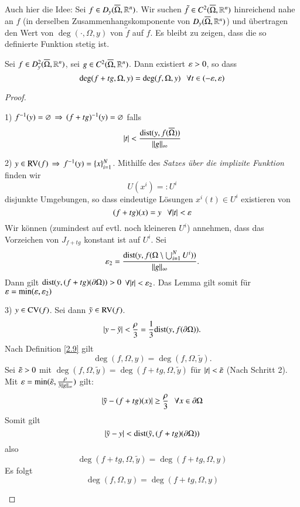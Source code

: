 Auch hier die Idee: Sei $f\in D_y(\overline \Omega, \mathbb{R}^n)$. Wir suchen $\tilde f \in C^2 (\overline \Omega, \mathbb{R}^n)$
hinreichend nahe an $f$ (in derselben Zusammenhangskomponente von $D_y(\overline \Omega, \mathbb{R}^n)$) und übertragen
den Wert von $\deg(\cdot , \Omega, y)$ von $\tilde f$ auf $f$. Es bleibt zu zeigen, dass die so
definierte Funktion stetig ist.

\begin{lem}\label{2.10}
    Sei $f\in D_y^2(\overline \Omega, \mathbb{R}^n)$, sei $g\in C^2(\overline \Omega, \mathbb{R}^n)$. Dann existiert $\varepsilon >0$, so 
    dass
    \[
        \deg (f+tg,\Omega,y)= \deg(f,\Omega,y) \hspace{.25cm} \forall t\in (-\varepsilon,\varepsilon)
    \]
\end{lem}
\begin{proof}
    \begin{description}
        \item{1)}
        $f^{-1}(y)=\varnothing \, \Rightarrow \, (f+tg)^{-1}(y)=\varnothing$ falls
        \[
            |t| < \frac{\mathrm{dist}(y,f(\overline \Omega))}{\|g\|_\infty}
        \]
        \item{2)}
        $y\in \mathrm{RV} (f) \, \Rightarrow \, f^{-1}(y)=\{x\}_{i=1}^N$. Mithilfe des \textit{Satzes über die 
            implizite Funktion} finden wir
            \[
                U(x^i)=:U^i
            \]
            disjunkte Umgebungen, so dass eindeutige Lösungen $x^i(t)\in U^i$ existieren von
            \[
                (f+tg)(x)=y \hspace{.25cm} \forall |t|<\varepsilon
            \]
            Wir können (zumindest auf evtl. noch kleineren $U^i$) annehmen, dass das Vorzeichen
            von $J_{f+tg}$ konstant ist auf $U^i$. Sei 
            \[
                \varepsilon _2= \frac{\mathrm{dist}(y,f(\Omega\setminus \bigcup_{i=1}^NU^i))}{\|g\|_\infty}.
            \]
            Dann gilt $\mathrm{dist}(y,(f+tg)(\partial \Omega))>0$ $\forall |t|<\varepsilon_2$. Das Lemma gilt somit
            für $\varepsilon = \min(\varepsilon,\varepsilon_2)$
        \item{3)}
            $y\in \mathrm{CV}(f)$. Sei dann $\tilde y\in \mathrm{RV}(f)$.
            \[
                |y-\tilde y|< \frac{\rho}{3} = \frac13 \mathrm{dist}(y,f(\partial \Omega)).
            \]
            Nach Definition \ref{2.9} gilt
            \[
                \deg (f,\Omega,y)=\deg(f,\Omega,\tilde y).
            \]
            Sei $\tilde {\varepsilon}>0$ mit $\deg(f,\Omega,\tilde y)=\deg(f+tg,\Omega,\tilde y)$ für $|t|<\tilde
            {\varepsilon}$ (Nach Schritt 2).
            Mit $\varepsilon=\min(\tilde {\varepsilon} , \frac{\rho}{3\|g\|_\infty})$ gilt:
            \[
                |\tilde y-(f+tg)(x)|\geq \frac{\rho}{3} \hspace{.25cm} \forall x \in \partial \Omega
            \]
            Somit gilt
            \[
                |\tilde y-y|< \mathrm{dist} (\tilde y, (f+tg)(\partial \Omega))
            \]
            also
            \[
                \deg(f+tg,\Omega,\tilde y)= \deg (f+tg,\Omega,y)
            \]
            Es folgt
            \[
                \deg(f,\Omega, y)= \deg(f+tg,\Omega,y)
            \]
    \end{description}
    \[ \]
\end{proof}


